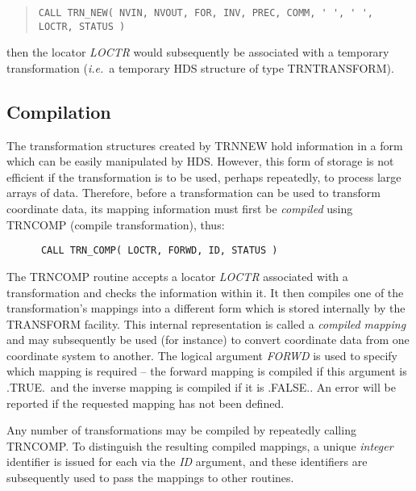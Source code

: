 \documentclass[twoside,11pt]{article}
\newcommand{\xlabel}[1]{}
\renewcommand{\_}{\texttt{\symbol{95}}}
\newcommand{\name}[1]{\mbox{\small{#1}}}
\newcommand{\fortvar}[1]{\mbox{\emph{#1}}}
\begin{document}
\begin{quote}\small
\begin{verbatim}
CALL TRN_NEW( NVIN, NVOUT, FOR, INV, PREC, COMM, ' ', ' ', LOCTR, STATUS )
\end{verbatim}
\end{quote}

then the locator \fortvar{LOCTR} would subsequently be associated with a
temporary transformation (\emph{i.e.}\ a temporary \name{HDS} structure of
type \name{TRN\_TRANSFORM}).


\subsection{\xlabel{compilation}Compilation}

The transformation structures created by \name{TRN\_NEW} hold information in
a form which can be easily manipulated by \name{HDS}.
However, this form of storage is not efficient if the transformation is to
be used, perhaps repeatedly, to process large arrays of data.
Therefore, before a transformation can be used to transform coordinate data,
its mapping information must first be \emph{compiled} using \name{TRN\_COMP}
(compile transformation), thus:

\begin{verbatim}
      CALL TRN_COMP( LOCTR, FORWD, ID, STATUS )
\end{verbatim}

The \name{TRN\_COMP} routine accepts a locator \fortvar{LOCTR} associated
with a transformation and checks the information within it.
It then compiles one of the transformation's mappings into a different form
which is stored internally by the \name{TRANSFORM} facility.
This internal representation is called a \emph{compiled mapping} and may
subsequently be used (for instance) to convert coordinate data from one
coordinate system to another.
The logical argument \fortvar{FORWD} is used to specify which mapping is
required -- the forward mapping is compiled if this argument is
\name{.TRUE.}\ and the inverse mapping is compiled if it is \name{.FALSE.}.
An error will be reported if the requested mapping has not been defined.

Any number of transformations may be compiled by repeatedly calling
\name{TRN\_COMP}.
To distinguish the resulting compiled mappings, a unique \emph{integer}
identifier is issued for each via the \fortvar{ID} argument, and these
identifiers are subsequently used to pass the mappings to other routines.
\end{document}
